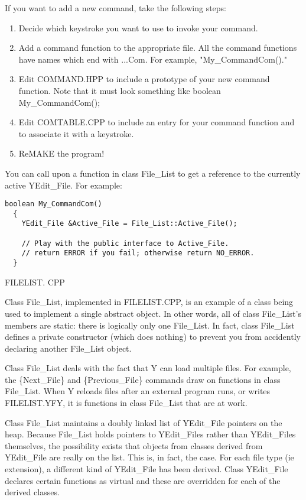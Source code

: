 If you want to add a new command, take the following steps:

\begin{enumerate}

\item Decide which keystroke you want to use to invoke your command.

\item Add a command function to the appropriate file. All the command functions have names which
  end with ...Com. For example, "My\_CommandCom()."

\item Edit COMMAND.HPP to include a prototype of your new command function. Note that it must
  look something like boolean My\_CommandCom();

\item Edit COMTABLE.CPP to include an entry for your command function and to associate it with a
  keystroke.

\item ReMAKE the program!

\end{enumerate}

You can call upon a function in class File\_List to get a reference to the currently active
YEdit\_File. For example:

\begin{verbatim}
boolean My_CommandCom()
  {
    YEdit_File &Active_File = File_List::Active_File();

    // Play with the public interface to Active_File.
    // return ERROR if you fail; otherwise return NO_ERROR.
  }
\end{verbatim}

FILELIST. CPP

Class File\_List, implemented in FILELIST.CPP, is an example of a class being used to implement a
single abstract object. In other words, all of class File\_List's members are static: there is
logically only one File\_List. In fact, class File\_List defines a private constructor (which does
nothing) to prevent you from accidently declaring another File\_List object.

Class File\_List deals with the fact that Y can load multiple files. For example, the
\{Next\_File\} and \{Previous\_File\} commands draw on functions in class File\_List. When Y
reloads files after an external program runs, or writes FILELIST.YFY, it is functions in class
File\_List that are at work.

Class File\_List maintains a doubly linked list of YEdit\_File pointers on the heap. Because
File\_List holds pointers to YEdit\_Files rather than YEdit\_Files themselves, the possibility
exists that objects from classes derived from YEdit\_File are really on the list. This is, in
fact, the case. For each file type (ie extension), a different kind of YEdit\_File has been
derived. Class YEdit\_File declares certain functions as virtual and these are overridden for
each of the derived classes.


